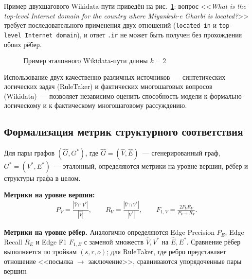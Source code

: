 Пример двухшагового Wikidata-пути приведён на рис.~\ref{fig:wikidata-path}: вопрос <<\textit{What is the top-level Internet domain for the country where Miyankuh-e Gharbi is located?}>> требует последовательного применения двух отношений (\texttt{located in} и \texttt{top-level Internet domain}), и ответ \texttt{.ir} не может быть получен без прохождения обоих рёбер.

\begin{figure}[H]
\centering
{}
\caption{Пример эталонного Wikidata-пути длины $k=2$}
\label{fig:wikidata-path}
\end{figure}

Использование двух качественно различных источников~--- синтетических логических задач (RuleTaker) и фактических многошаговых вопросов (Wikidata)~--- позволяет независимо оценить способность модели к формально-логическому и к фактическому многошаговому рассуждению.

\subsection{Формализация метрик структурного соответствия}
\label{subsec:metrics-formalization}

Для пары графов $(\hat{G}, G^*)$, где $\hat{G} = (\hat{V}, \hat{E})$~--- сгенерированный граф, $G^* = (V^*, E^*)$~--- эталонный, определяются метрики на уровне вершин, рёбер и структуры графа в целом.

\textbf{Метрики на уровне вершин:}
\begin{align}
    P_V = \frac{|\hat{V} \cap V^*|}{|\hat{V}|}, \qquad
    R_V = \frac{|\hat{V} \cap V^*|}{|V^*|}, \qquad
    F_{1,V} = \frac{2 P_V R_V}{P_V + R_V}.
\end{align}

\textbf{Метрики на уровне рёбер.} Аналогично определяются Edge Precision $P_E$, Edge Recall $R_E$ и Edge F1 $F_{1,E}$ с заменой множеств $\hat{V}, V^*$ на $\hat{E}, E^*$. Сравнение рёбер выполняется по тройкам $(s, r, o)$; для RuleTaker, где ребро представляет отношение <<посылка $\rightarrow$ заключение>>, сравниваются упорядоченные пары вершин.

